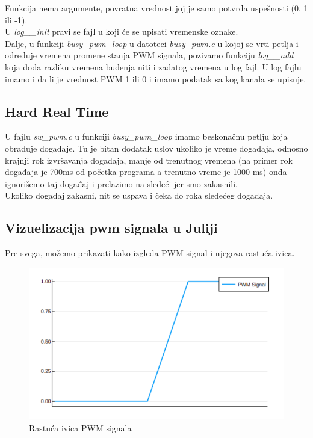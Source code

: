 \documentclass[a4paper, 11pt, titlepage]{article}
\begin{document}
Funkcija nema argumente, povratna vrednost joj je samo potvrda uspešnosti (0, 1 ili -1). \\

U \textit{log\_\_init} pravi se fajl u koji će se upisati vremenske oznake. \\ 

Dalje, u funkciji \textit{busy\_pwm\_loop} u datoteci \textit{busy\_pwm.c} u kojoj se vrti petlja i određuje vremena promene stanja PWM signala, pozivamo funkciju \textit{log\_\_add} koja doda razliku vremena buđenja niti i zadatog vremena u log fajl.  U log fajlu imamo i da li je vrednost PWM 1 ili 0 i imamo podatak sa kog kanala se upisuje. \\

  
\subsection{Hard Real Time}

U fajlu \textit{sw\_pwm.c} u funkciji \textit{busy\_pwm\_loop} imamo beskonačnu petlju koja obrađuje događaje. Tu je bitan dodatak uslov ukoliko je vreme događaja, odnosno krajnji rok izvršavanja događaja, manje od trenutnog vremena (na primer rok događaja je 700ms od početka programa a trenutno vreme je 1000 ms) onda ignorišemo taj događaj i prelazimo na sledeći jer smo zakasnili. \\ 

Ukoliko događaj zakasni, nit se uspava i čeka do roka sledećeg događaja.  



\newpage
\subsection{Vizuelizacija pwm signala u Juliji}

Pre svega, možemo prikazati kako izgleda PWM signal i njegova rastuća ivica. 

    \begin{figure}[h]
    \centering
    \includegraphics[width=0.50\linewidth]{rising_edge.png}
    \caption{Rastuća ivica PWM signala}
\end{figure}
\end{document}
